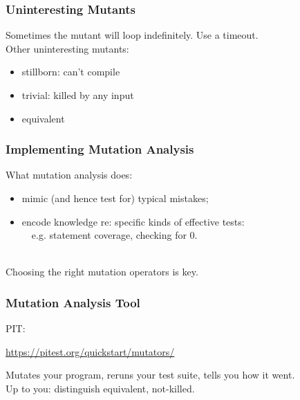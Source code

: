 \documentclass{beamer}
\newenvironment{changemargin}[1]{%
  \begin{list}{}{%
    \setlength{\topsep}{0pt}%
    \setlength{\leftmargin}{#1}%
    \setlength{\rightmargin}{1em}
    \setlength{\listparindent}{\parindent}%
    \setlength{\itemindent}{\parindent}%
    \setlength{\parsep}{\parskip}%
  }%
  \item[]}{\end{list}}
\begin{document}
\begin{frame}
  \frametitle{Uninteresting Mutants}

  \large
  \begin{changemargin}{2em}
    Sometimes the mutant will loop indefinitely. Use a timeout.\\[1em]
    Other uninteresting mutants:
    \begin{itemize}
    \item stillborn: can't compile
    \item trivial: killed by any input
      \item equivalent
    \end{itemize}
  \end{changemargin}
\end{frame}

\begin{frame}
  \frametitle{Implementing Mutation Analysis}

  \large
  \begin{changemargin}{2em}
    What mutation analysis does:
    \begin{itemize}
    \item mimic (and hence test for) typical mistakes;
    \item encode knowledge re: specific kinds of effective tests: \\
      ~~e.g. statement coverage, checking for 0.
    \end{itemize}
    ~\\
    Choosing the right mutation operators is key.
  \end{changemargin}
\end{frame}

\begin{frame}
  \frametitle{Mutation Analysis Tool}

  \Large
  \begin{changemargin}{2em}
    PIT: \\
    \begin{center} {\large
      \url{https://pitest.org/quickstart/mutators/} } \\[1em]
    \end{center}
    Mutates your program, reruns your test suite, tells you how it went.\\[1em]
    Up to you: distinguish equivalent, not-killed.
    
  \end{changemargin}
\end{frame}
\end{document}

